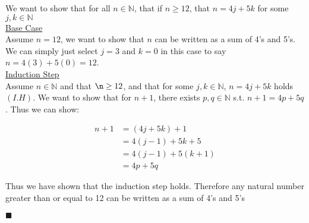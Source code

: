 \documentclass[20pt]{article}
\begin{document}
\begin{text}
    We want to show that for all $n \in \mathbb{N}$, that if $n \geq 12$, that $n = 4j + 5k$ for some $j,k \in \mathbb{N}$\\
    
    \noindent
    \underline{Base Case}\\
    Assume $n = 12$, we want to show that $n$ can be written as a sum of 4's and 5's. We can simply just select $j = 3$ and $k = 0$ in this case to say $n = 4(3) + 5(0) = 12$.\\
    
    \noindent
    \underline{Induction Step}\\
    Assume $n \in \mathbb{N}$ and that $\n \geq 12$, and that for some $j,k \in \mathbb{N}$, $n = 4j + 5k$ holds $(I.H)$. We want to show that for $n + 1$, there exists $p,q \in \mathbb{N}$ s.t. $n + 1 = 4p + 5q$. Thus we can show:
    
    \begin{align}
        n + 1 &= (4j + 5k) + 1 \tag{By I.H}\nonumber\\
        &= 4(j-1) + 5k + 5\nonumber\\
        &= 4(j - 1) + 5(k + 1)\nonumber\\
        &= 4p + 5q\tag{Pick $p = j - 1$ and $q = k + 1$}\nonumber
    \end{align}
    
    \noindent
    Thus we have shown that the induction step holds. Therefore any natural number greater than or equal to 12 can be written as a sum of 4's and 5's
    
    \hfill $\blacksquare$
\end{text}\\
\end{document}
